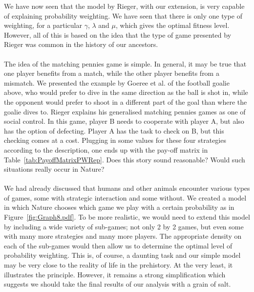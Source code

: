 \documentclass[a4paper,10pt]{article}
\numberwithin{equation}{section}
\begin{document}
We have now seen that the model by Rieger, with our extension, is very capable of explaining probability weighting. We have seen that there is only one type of weighting, for a particular $\gamma$, $\lambda$ and $\mu$, which gives the optimal fitness level. However, all of this is based on the idea that the type of game presented by Rieger was common in the history of our ancestors.\\
\\
The idea of the matching pennies game is simple. In general, it may be true that one player benefits from a match, while the other player benefits from a mismatch. We presented the example by Goeree et al. of the football goalie above, who would prefer to dive in the same direction as the ball is shot in, while the opponent would prefer to shoot in a different part of the goal than where the goalie dives to. Rieger explains his generalised matching pennies games as one of social control. In this game, player B needs to cooperate with player A, but also has the option of defecting. Player A has the task to check on B, but this checking comes at a cost. Plugging in some values for these four strategies according to the description, one ends up with the pay-off matrix in Table~\ref{tab:PayoffMatrixPWRep}. Does this story sound reasonable? Would such situations really occur in Nature?\\
\\
We had already discussed that humans and other animals encounter various types of games, some with strategic interaction and some without. We created a model in which Nature chooses which game we play with a certain probability as in Figure~\ref{fig:Graph8.pdf}. To be more realistic, we would need to extend this model by including a wide variety of sub-games; not only 2 by 2 games, but even some with many more strategies and many more players. The appropriate density on each of the sub-games would then allow us to determine the optimal level of probability weighting. This is, of course, a daunting task and our simple model may be very close to the reality of life in the prehistory. At the very least, it illustrates the principle. However, it remains a strong simplification which suggests we should take the final results of our analysis with a grain of salt.

\end{document}
